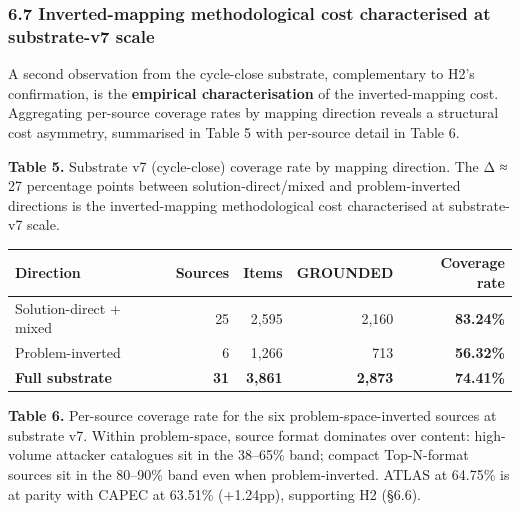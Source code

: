 \documentclass[
]{article}
\begin{document}
\subsubsection{6.7 Inverted-mapping methodological cost characterised at
substrate-v7
scale}\label{inverted-mapping-methodological-cost-characterised-at-substrate-v7-scale}

A second observation from the cycle-close substrate, complementary to
H2's confirmation, is the \textbf{empirical characterisation} of the
inverted-mapping cost. Aggregating per-source coverage rates by mapping
direction reveals a structural cost asymmetry, summarised in Table 5
with per-source detail in Table 6.

\textbf{Table 5.} Substrate v7 (cycle-close) coverage rate by mapping
direction. The Δ ≈ 27 percentage points between solution-direct/mixed
and problem-inverted directions is the inverted-mapping methodological
cost characterised at substrate-v7 scale.

\begin{longtable}[]{@{}lrrrr@{}}
\toprule\noalign{}
Direction & Sources & Items & GROUNDED & Coverage rate \\
\midrule\noalign{}
\endhead
\bottomrule\noalign{}
\endlastfoot
Solution-direct + mixed & 25 & 2,595 & 2,160 & \textbf{83.24\%} \\
Problem-inverted & 6 & 1,266 & 713 & \textbf{56.32\%} \\
\textbf{Full substrate} & \textbf{31} & \textbf{3,861} & \textbf{2,873}
& \textbf{74.41\%} \\
\end{longtable}

\textbf{Table 6.} Per-source coverage rate for the six
problem-space-inverted sources at substrate v7. Within problem-space,
source format dominates over content: high-volume attacker catalogues
sit in the 38--65\% band; compact Top-N-format sources sit in the
80--90\% band even when problem-inverted. ATLAS at 64.75\% is at parity
with CAPEC at 63.51\% (+1.24pp), supporting H2 (§6.6).
\end{document}

